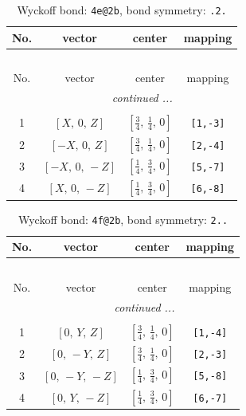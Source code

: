 \documentclass[fleqn,8pt]{jsarticle}
\begin{document}
\renewcommand{\arraystretch}{1.2}
\begin{longtable}{cccc}
\caption{Wyckoff bond: {\tt 4e@2b}, bond symmetry: {\tt .2.}}
 \\
 \hline \hline
No. & vector & center & mapping \\ \hline \endfirsthead

\multicolumn{3}{l}{\tablename\ \thetable{}} \\
 \hline \hline
No. & vector & center & mapping \\ \hline \endhead

 \hline \hline
\multicolumn{3}{r}{\footnotesize\it continued ...} \\ \endfoot

 \hline \hline
\multicolumn{3}{r}{} \\ \endlastfoot

1 & $\left[ X,\, 0,\, Z \right]$ & $\left[ \frac{3}{4},\, \frac{1}{4},\, 0 \right]$ & {\tt [1,-3]} \\ \hline
2 & $\left[ - X,\, 0,\, Z \right]$ & $\left[ \frac{3}{4},\, \frac{1}{4},\, 0 \right]$ & {\tt [2,-4]} \\ \hline
3 & $\left[ - X,\, 0,\, - Z \right]$ & $\left[ \frac{1}{4},\, \frac{3}{4},\, 0 \right]$ & {\tt [5,-7]} \\ \hline
4 & $\left[ X,\, 0,\, - Z \right]$ & $\left[ \frac{1}{4},\, \frac{3}{4},\, 0 \right]$ & {\tt [6,-8]} \\
\end{longtable}
\renewcommand{\arraystretch}{1.2}
\begin{longtable}{cccc}
\caption{Wyckoff bond: {\tt 4f@2b}, bond symmetry: {\tt 2..}}
 \\
 \hline \hline
No. & vector & center & mapping \\ \hline \endfirsthead

\multicolumn{3}{l}{\tablename\ \thetable{}} \\
 \hline \hline
No. & vector & center & mapping \\ \hline \endhead

 \hline \hline
\multicolumn{3}{r}{\footnotesize\it continued ...} \\ \endfoot

 \hline \hline
\multicolumn{3}{r}{} \\ \endlastfoot

1 & $\left[ 0,\, Y,\, Z \right]$ & $\left[ \frac{3}{4},\, \frac{1}{4},\, 0 \right]$ & {\tt [1,-4]} \\ \hline
2 & $\left[ 0,\, - Y,\, Z \right]$ & $\left[ \frac{3}{4},\, \frac{1}{4},\, 0 \right]$ & {\tt [2,-3]} \\ \hline
3 & $\left[ 0,\, - Y,\, - Z \right]$ & $\left[ \frac{1}{4},\, \frac{3}{4},\, 0 \right]$ & {\tt [5,-8]} \\ \hline
4 & $\left[ 0,\, Y,\, - Z \right]$ & $\left[ \frac{1}{4},\, \frac{3}{4},\, 0 \right]$ & {\tt [6,-7]} \\
\end{longtable}
\end{document}
